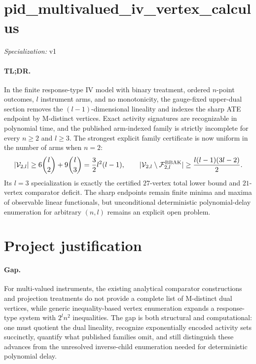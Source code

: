 \documentclass{article}
\begin{document}
\sloppy

\section*{pid\_\allowbreak{}multivalued\_\allowbreak{}iv\_\allowbreak{}vertex\_\allowbreak{}calculus}

\noindent\textit{Specialization:} v1\par

\paragraph{TL;DR.} In the finite response-type IV model with binary treatment, ordered \(n\)-point outcomes, \(l\) instrument arms, and no monotonicity, the gauge-fixed upper-dual section removes the \((l-1)\)-dimensional lineality and indexes the sharp ATE endpoint by M-distinct vertices. Exact activity signatures are recognizable in polynomial time, and the published arm-indexed family is strictly incomplete for every \(n\ge2\) and \(l\ge3\). The strongest explicit family certificate is now uniform in the number of arms when \(n=2\):
\[
\makebox[\linewidth][c]{\resizebox{0.98\linewidth}{!}{\par\noindent \makebox[\linewidth][c]{\resizebox{0.98\linewidth}{!}{\(\displaystyle \displaystyle |\mathcal V_{2,l}|\ge6\binom l2+9\binom l3=\frac32l^2(l-1),\qquad |\mathcal V_{2,l}\setminus\mathcal F^{\mathrm{BBAK}}_{2,l}|\ge\frac{l(l-1)(3l-2)}2.\)}}\par\noindent}}
\]
Its \(l=3\) specialization is exactly the certified \(27\)-vertex total lower bound and \(21\)-vertex comparator deficit. The sharp endpoints remain finite minima and maxima of observable linear functionals, but unconditional deterministic polynomial-delay enumeration for arbitrary \((n,l)\) remains an explicit open problem.

\section{Project justification}

\paragraph{Gap.} For multi-valued instruments, the existing analytical comparator constructions and projection treatments do not provide a complete list of M-distinct dual vertices, while generic inequality-based vertex enumeration expands a response-type system with \(2^l n^2\) inequalities. The gap is both structural and computational: one must quotient the dual lineality, recognize exponentially encoded activity sets succinctly, quantify what published families omit, and still distinguish these advances from the unresolved inverse-child enumeration needed for deterministic polynomial delay.
\end{document}
